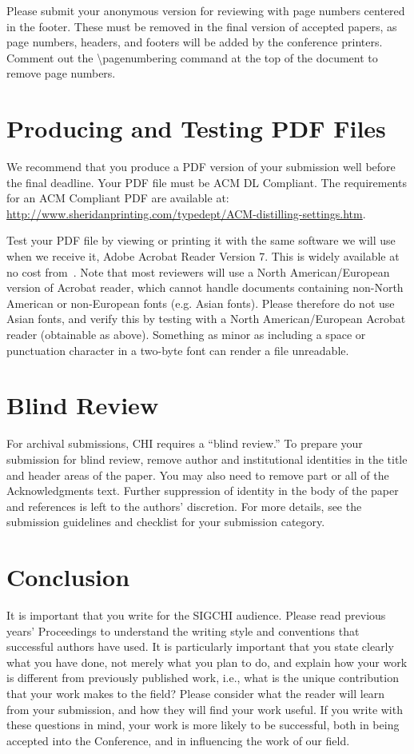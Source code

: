\documentclass{sigchi-alternate}
\begin{document}
Please submit your anonymous version for reviewing with page numbers
centered in the footer.  These must be removed in the final version of
accepted papers, as page numbers, headers, and footers will be added
by the conference printers.  Comment out the {\textbackslash}pagenumbering
command at the top of the document to remove page numbers.

\section{Producing and Testing PDF Files}

We recommend that you produce a PDF version of your submission well
before the final deadline.  Your PDF file must be ACM DL
Compliant. The requirements for an ACM Compliant PDF are available at:
{\url{http://www.sheridanprinting.com/typedept/ACM-distilling-settings.htm}}.

Test your PDF file by viewing or printing it with the same software we
will use when we receive it, Adobe Acrobat Reader Version 7. This is
widely available at no cost from~\cite{acrobat}.  Note that most
reviewers will use a North American/European version of Acrobat
reader, which cannot handle documents containing non-North American or
non-European fonts (e.g. Asian fonts).  Please therefore do not use
Asian fonts, and verify this by testing with a North American/European
Acrobat reader (obtainable as above). Something as minor as including
a space or punctuation character in a two-byte font can render a file
unreadable.

\section{Blind Review}

For archival submissions, CHI requires a ``blind review.'' To prepare
your submission for blind review, remove author and institutional
identities in the title and header areas of the paper. You may also
need to remove part or all of the Acknowledgments text.  Further
suppression of identity in the body of the paper and references is
left to the authors' discretion. For more details, see the submission
guidelines and checklist for your submission category.

\section{Conclusion}

It is important that you write for the SIGCHI audience.  Please read
previous years' Proceedings to understand the writing style and
conventions that successful authors have used.  It is particularly
important that you state clearly what you have done, not merely what
you plan to do, and explain how your work is different from previously
published work, i.e., what is the unique contribution that your work
makes to the field?  Please consider what the reader will learn from
your submission, and how they will find your work useful.  If you
write with these questions in mind, your work is more likely to be
successful, both in being accepted into the Conference, and in
influencing the work of our field.
\end{document}
